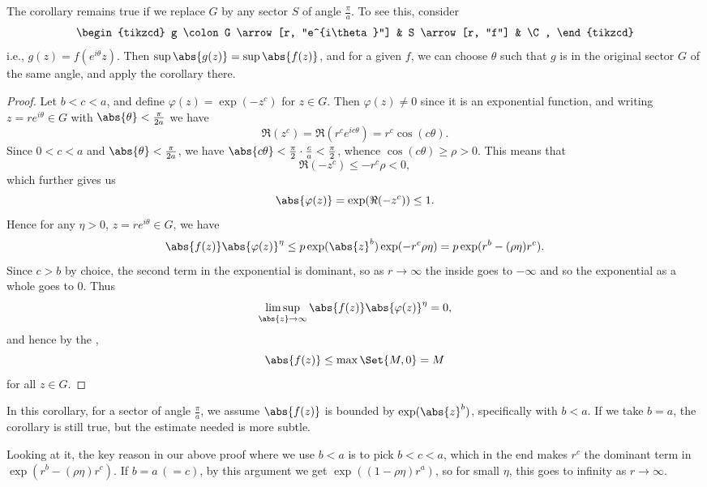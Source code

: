 \begin{remark}\label{remark:cor6.11}
	The corollary remains true if we replace $G$ by any sector $S$ of angle $\frac{\pi}{a}$.
	To see this, consider
	\[
		\begin{tikzcd}
			g \colon G \arrow[r, "e^{i\theta}"] & S \arrow[r, "f"] & \C,
		\end{tikzcd}
	\]
	i.e., $g(z) = f(e^{i \theta} z)$.
	Then $\sup \abs{g(z)} = \sup \abs{f(z)}$, and for a given $f$, we can choose $\theta$ such that $g$ is in the original sector $G$ of the same angle, and apply the corollary there.
\end{remark}

\begin{proof}
	Let $b < c < a$, and define $\varphi(z) = \exp(-z^c)$ for $z \in G$.
	Then $\varphi(z) \neq 0$ since it is an exponential function, and writing $z = r e^{i \theta} \in G$ with $\abs{\theta} < \frac{\pi}{2 a}$ we have
	\[
		\Re(z^c) = \Re(r^c e^{i c \theta}) = r^c \cos(c \theta).
	\]
	Since $0 < c < a$ and $\abs{\theta} < \frac{\pi}{2 a}$, we have $\abs{c \theta} < \frac{\pi}{2} \cdot \frac{c}{a} < \frac{\pi}{2}$, whence $\cos(c \theta) \geq \rho > 0$.
	This means that
	\[
		\Re(- z^c) \leq -r^c \rho < 0,
	\]
	which further gives us
	\[
		\abs{\varphi(z)} = \exp(\Re(-z^c)) \leq 1.
	\]
	Hence for any $\eta > 0$, $z = r e^{i \theta} \in G$, we have
	\[
		\abs{f(z)} \abs{\varphi(z)}^\eta \leq p \exp(\abs{z}^b) \exp(-r^c \rho \eta) = p \exp(r^b - (\rho \eta) r^c).
	\]
	Since $c > b$ by choice, the second term in the exponential is dominant, so as $r \to \infty$ the inside goes to $-\infty$ and so the exponential as a whole goes to $0$.
	Thus
	\[
		\limsup_{\abs{z} \to \infty} \abs{f(z)} \abs{\varphi(z)}^\eta = 0,
	\]
	and hence by the ,
	\[
		\abs{f(z)} \leq \max\Set{M, 0} = M
	\]
	for all $z \in G$.
\end{proof}

\begin{remark}
	In this corollary, for a sector of angle $\frac{\pi}{a}$, we assume $\abs{f(z)}$ is bounded by $\exp(\abs{z}^b)$, specifically with $b < a$.
	If we take $b = a$, the corollary is still true, but the estimate needed is more subtle.

	Looking at it, the key reason in our above proof where we use $b < a$ is to pick $b < c < a$, which in the end makes $r^c$ the dominant term in $\exp(r^b - (\rho \eta) r^c)$.
	If $b = a\, (= c)$, by this argument we get $\exp((1 - \rho \eta) r^a)$, so for small $\eta$, this goes to infinity as $r \to \infty$.
\end{remark}

